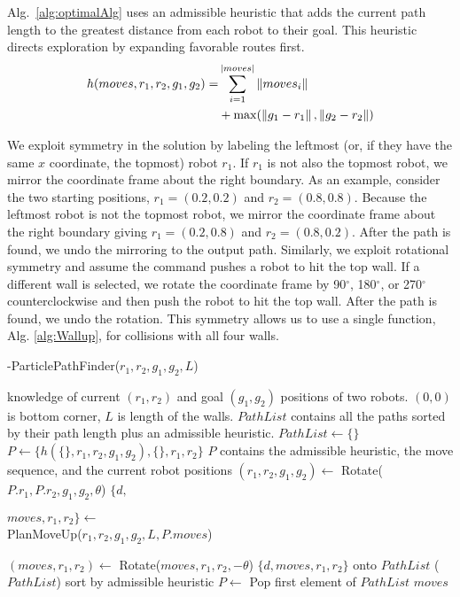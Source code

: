Alg.~\ref{alg:optimalAlg} uses an admissible heuristic that adds the current path length to the greatest distance from each robot to their goal. This heuristic directs exploration by expanding favorable routes first.
\begin{align}\label{eq:admissibleHeuristic}
h(moves, r_1,r_2,g_1,g_2) =& \sum_{i=1}^{|moves|} \left\lVert moves_i\right\rVert  \\
&+  \max( \left\lVert g_1-r_1\right\rVert, \left\lVert g_2-r_2\right\rVert ) \nonumber
\end{align}


We  exploit symmetry in the solution by labeling the leftmost (or, if they have the same $x$ coordinate, the topmost) robot $r_1$. 
 If $r_1$ is not also the topmost robot, we mirror the coordinate frame about the right boundary. 
 As an example, consider the two starting positions, $r_1 =  (0.2, 0.2) $ and $r_2 = (0.8, 0.8)$. 
  Because the leftmost robot is not the topmost robot, we mirror the coordinate frame about the right boundary giving $r_1 = (0.2, 0.8)$ and $r_2 = (0.8,0.2)$. 
 After the path is found, we undo the mirroring to the output path. 
  Similarly, we exploit rotational symmetry and assume the command pushes a robot to hit the top wall.
   If a different wall is selected, we rotate the coordinate frame by 90$^{\circ}$, 180$^{\circ}$, or 270$^{\circ}$ counterclockwise and then push the robot to hit the top wall.  After the path is found, we undo the rotation. 
   This symmetry allows us to use a single function, Alg. \ref{alg:Wallup},  for collisions with all four walls. 

\begin{algorithm}[htb]
\caption{ { -ParticlePathFinder}($r_1,r_2,g_1,g_2,L$)}\label{alg:optimalAlg}
\begin{algorithmic}[1]
\Require knowledge of current $(r_1,r_2)$ and goal $(g_1,g_2)$ positions of  two robots. 
$(0,0)$ is bottom corner,
 $L$ is length of the walls. 
 $PathList$ contains all the paths sorted by their path length plus an admissible heuristic. 
 \State  $PathList \gets \{\}$
 \State $P \gets   \{ h(\{\},r_1,r_2,g_1,g_2  ) ,\{\},r_1,r_2\} $ \Comment $P$ contains the admissible heuristic, the move sequence, and the current robot positions
\State $(r_1,r_2,g_1,g_2) \gets$ {\sc Rotate}($P.r_1,P.r_2,g_1,g_2,\theta$)
\State $\{d, $ \parbox[t]{.3\linewidth}{%
 $moves, r_1,r_2\} \gets$\\
 {\sc  PlanMoveUp}($r_1,r_2,g_1,g_2,L, P.moves$)}
\State $(moves, r_1,r_2) \gets$ {\sc Rotate}($moves, r_1,r_2,-\theta$)
 $\{d, moves, r_1,r_2\} $ onto $PathList$
\EndFor
{}($PathList$) \Comment sort by admissible heuristic
\State $P \gets $ {\sc Pop} first element of $PathList$
\EndWhile
\State \Return $moves$
\end{algorithmic}
\end{algorithm}


